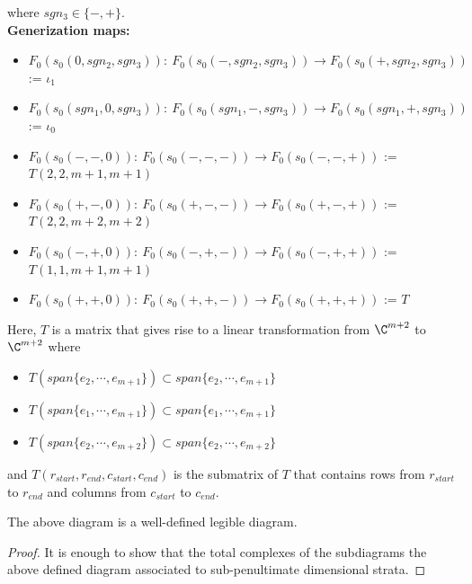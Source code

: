 where $sgn_3 \in \{-, + \}$.\\
\textbf{Generization maps:}
\begin{itemize}
\item $F_0(s_0(0,sgn_2,sgn_3)):~ F_0(s_0(-,sgn_2,sgn_3))\rightarrow F_0(s_0(+,sgn_2,sgn_3))$ := $\iota_1$ 

\item $F_0(s_0(sgn_1,0,sgn_3)):~ F_0(s_0(sgn_1,-,sgn_3))\rightarrow F_0(s_0(sgn_1,+,sgn_3))$ := $\iota_0$ 

\item $F_0(s_0(-,-,0)):~ F_0(s_0(-,-,-))\rightarrow F_0(s_0(-,-,+))$ := $T(2,2,m+1,m+1)$ 

\item $F_0(s_0(+,-,0)):~ F_0(s_0(+,-,-))\rightarrow F_0(s_0(+,-,+))$ := $T(2,2,m+2,m+2)$ 

\item $F_0(s_0(-,+,0)):~ F_0(s_0(-,+,-))\rightarrow F_0(s_0(-,+,+))$ := $T(1,1,m+1,m+1)$ 

\item $F_0(s_0(+,+,0)):~ F_0(s_0(+,+,-))\rightarrow F_0(s_0(+,+,+))$ := $T$ 
\end{itemize}
Here, $T$ is a matrix that gives rise to a linear transformation from $\C^{m+2}$ to $\C^{m+2}$ where
\begin{itemize}
\item $T(span\{ e_2, \cdots, e_{m+1} \}) \subset span\{ e_2, \cdots, e_{m+1} \}$

\item $T(span\{ e_1, \cdots, e_{m+1} \}) \subset span\{ e_1, \cdots, e_{m+1} \}$

\item $T(span\{ e_2, \cdots, e_{m+2} \}) \subset span\{ e_2, \cdots, e_{m+2} \}$
\end{itemize}
and $T(r_{start},r_{end},c_{start},c_{end})$ is the submatrix of $T$ that contains rows from $r_{start}$ to $r_{end}$ and columns from $c_{start}$ to $c_{end}$.
\begin{proposition}
The above diagram is a well-defined legible diagram.
\end{proposition}
\begin{proof}
It is enough to show that the total complexes of the subdiagrams the above defined diagram associated to sub-penultimate dimensional strata.
\end{proof}
